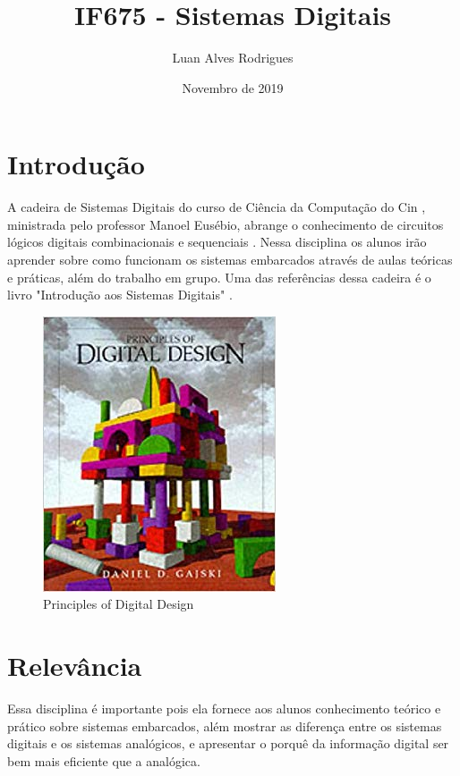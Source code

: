 \documentclass[a4paper,10pt]{extarticle}
\title{IF675 - Sistemas Digitais}
\author{Luan Alves Rodrigues }
\date{Novembro de 2019}
\begin{document}
\maketitle

\section{Introdução}
A cadeira de Sistemas Digitais do curso de Ciência da Computação do Cin , ministrada pelo professor Manoel Eusébio, abrange o conhecimento de circuitos lógicos digitais combinacionais e sequenciais \citep{sistemas}. Nessa disciplina os alunos irão aprender sobre como funcionam os sistemas embarcados através de aulas teóricas e práticas\citep{SiteDisciplina}, além do trabalho em grupo. Uma das referências dessa cadeira é o livro "Introdução aos Sistemas Digitais" \citep{Livro}.

\begin{figure}[h!]
\centering
\includegraphics[scale=0.7]{1}
\caption{Principles of Digital Design\citep{Imagem}}
\label{fig:1}
\end{figure}


\section{Relevância}
Essa disciplina é importante pois ela fornece aos alunos conhecimento teórico e prático sobre sistemas embarcados, além mostrar as diferença entre os sistemas digitais e os sistemas analógicos, e apresentar o porquê da informação digital ser bem mais eficiente que a analógica.
\end{document}
